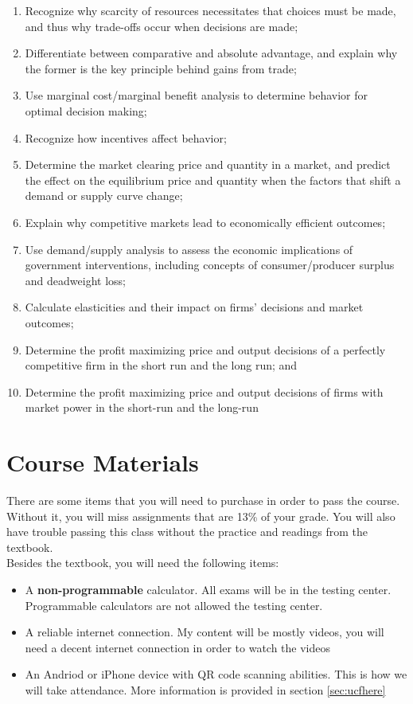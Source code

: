\documentclass[11pt]{paper}
\begin{document}
\begin{enumerate}
	\item Recognize why scarcity of resources necessitates that choices must be made, and thus why trade-offs occur when decisions are made;
  	\item Differentiate between comparative and absolute advantage, and explain why the former is the key principle behind gains from trade;
	\item Use marginal cost/marginal benefit analysis to determine behavior for optimal decision making;
	\item Recognize how incentives affect behavior;
	\item Determine the market clearing price and quantity in a market, and predict the effect on the equilibrium price and quantity when the factors that shift a demand or supply curve change;
	\item Explain why competitive markets lead to economically efficient outcomes;
	\item Use demand/supply analysis to assess the economic implications of government interventions, including concepts of consumer/producer surplus and deadweight loss;
	\item Calculate elasticities and their impact on firms’ decisions and market outcomes;
	\item Determine the profit maximizing price and output decisions of a perfectly competitive firm in the short run and the long run; and
	\item Determine the profit maximizing price and output decisions of firms with market power in the short-run and the long-run
\end{enumerate}

\section{Course Materials}
 
There are some items that you will need to purchase in order to pass the course. Without it, you will miss assignments that are 13\% of your grade. You will also have trouble passing this class without the practice and readings from the textbook.\\

Besides the textbook, you will need the following items:

\begin{itemize}
	\item A \textbf{non-programmable} calculator. All exams will be in the testing center. Programmable calculators are not allowed the testing center. 
	\item A reliable internet connection. My content will be mostly videos, you will need a decent internet connection in order to watch the videos
	\item An Andriod or iPhone device with QR code scanning abilities. This is how we will take attendance. More information is provided in section \ref{sec:ucfhere}
\end{itemize}
\end{document}

